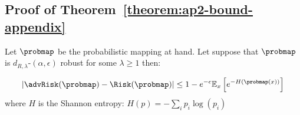 \subsection{Proof of Theorem~\ref{theorem:ap2-bound-appendix}}


\begin{theorem}

\label{theorem:ap2-bound-appendix}
Let $\probmap$ be the probabilistic mapping at hand. Let suppose that  $\probmap$ is $d_{R,\lambda}$-$(\alpha,\epsilon)$ robust for some $\lambda\geq1$ then:

$$|\advRisk(\probmap)-\Risk(\probmap)|\leq 1-e^{-\epsilon}\mathbb{E}_x\left[e^{-H(\probmap(x))}\right]$$
where $H$ is the Shannon entropy: $H(p)=-\sum_i p_i \log(p_i)$
\end{theorem}

